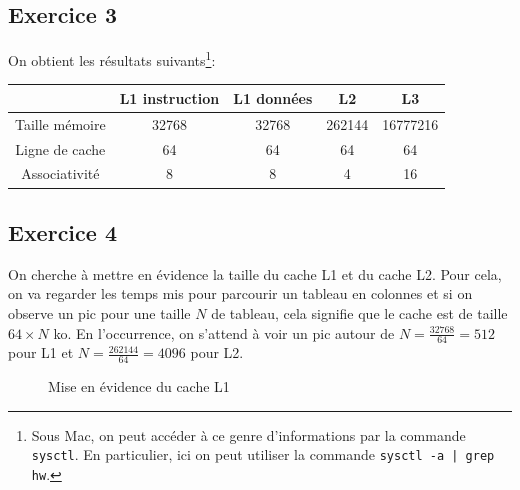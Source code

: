 \documentclass[11pt, a4 paper]{article}
\begin{document}
\subsection{Exercice 3}

On obtient les résultats suivants\footnote{Sous Mac, on peut accéder à ce genre d'informations par la commande \texttt{sysctl}.
En particulier, ici on peut utiliser la commande \texttt{sysctl -a | grep hw}.}:
\begin{center}\label{ex3:tab}
    \begin{tabular}{| c || c | c | c | c |}
        \hline
    & L1 instruction & L1 données & L2 & L3 \\
        \hline
    Taille mémoire & 32768 & 32768 & 262144 & 16777216 \\
        \hline
    Ligne de cache & 64 & 64 & 64 & 64 \\
        \hline
    Associativité & 8 & 8 & 4 & 16 \\
        \hline
    \end{tabular}
\end{center}

\subsection{Exercice 4}
On cherche à mettre en évidence la taille du cache L1 et du cache L2.
Pour cela, on va regarder les temps mis pour parcourir un tableau en colonnes et si on observe un pic pour une taille $N$ de tableau, cela signifie que le cache est de taille $64\times N$ ko.
En l'occurrence, on s'attend à voir un pic autour de $N = \frac{32768}{64} = 512$ pour L1 et $N = \frac{262144}{64} = 4096$ pour L2.

\begin{figure}[!h]
    \caption{Mise en évidence du cache L1}
\end{figure}
\end{document}

